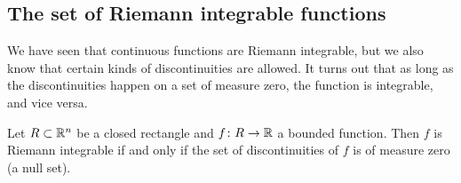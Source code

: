 \subsection{The set of Riemann integrable functions}

We have seen that continuous functions are Riemann integrable, but we also
know that certain kinds of discontinuities are allowed.
It turns out that as long as the discontinuities happen on a set of measure
zero, the function is integrable, and vice versa.

\begin{thm}
Let $R \subset {\mathbb{R}}^n$ be a closed rectangle and $f \colon R \to {\mathbb{R}}$
a bounded function.  Then $f$ is Riemann integrable if and only if
the set of discontinuities of $f$ is of measure zero (a null set).
\end{thm}


